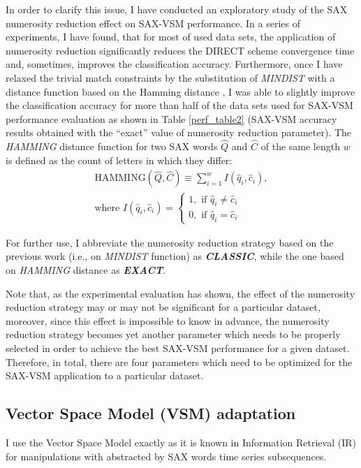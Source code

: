 In order to clarify this issue, I have conducted an exploratory study of the SAX numerosity reduction 
effect on SAX-VSM performance. In a series of experiments, I have found, that for most of used data sets, the application of 
numerosity reduction significantly reduces the DIRECT scheme convergence time and, sometimes, improves the classification accuracy. 
Furthermore, once I have relaxed the trivial match constraints by the substitution of 
\textit{MINDIST} with a distance function based on the Hamming distance \cite{hamming}, 
I was able to slightly improve the classification accuracy for more than half of the data sets used for \mbox{SAX-VSM}
performance evaluation as shown in Table \ref{perf_table2} (SAX-VSM accuracy results obtained with the ``exact'' 
value of numerosity reduction parameter). 
The \textit{HAMMING} distance function for two SAX words $\hat{Q}$ and $\hat{C}$ of the same length $w$ 
is defined as the count of letters in which they differ:
\begin{equation}
\label{eq:hamming}
\begin{split}
\text{HAMMING}(\widehat{Q},\widehat{C}) \equiv \sum_{i=1}^{w} I( \widehat{q}_{i}, \widehat{c}_{i} ), \\
\text{where } I( \widehat{q}_{i}, \widehat{c}_{i} ) = 
\begin{cases}
 1,\text{ if } \widehat{q}_{i} \neq \widehat{c}_{i} \\
 0,\text{ if } \widehat{q}_{i} = \widehat{c}_{i}
\end{cases}
\end{split}                                                      
\end{equation}

For further use, I abbreviate the numerosity reduction strategy based on the previous work (i.e., on \textit{MINDIST} 
function) as \textit{\textbf{CLASSIC}}, while the one based on \textit{HAMMING} distance as \textit{\textbf{EXACT}}.

Note that, as the experimental evaluation has shown, the effect of the numerosity reduction strategy may or may not be significant 
for a particular dataset, moreover, since this effect is impossible to know in advance, the numerosity reduction strategy becomes 
yet another parameter which needs to be properly selected in order to achieve the best SAX-VSM performance for a given dataset. 
Therefore, in total, there are four parameters which need to be optimized for the SAX-VSM application to a particular dataset.

\subsection{Vector Space Model (VSM) adaptation}\label{vsm}
I use the Vector Space Model exactly as it is known in Information Retrieval (IR) \cite{citeulike:300428} for 
manipulations with abstracted by SAX words time series subsequences. 

